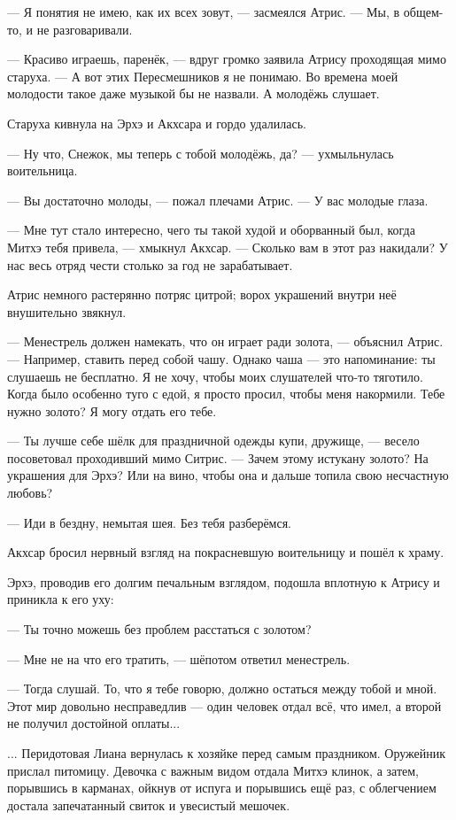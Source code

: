 --- Я понятия не имею, как их всех зовут, --- засмеялся Атрис.
--- Мы, в общем-то, и не разговаривали.

--- Красиво играешь, паренёк, --- вдруг громко заявила Атрису проходящая мимо старуха.
--- А вот этих Пересмешников я не понимаю.
Во времена моей молодости такое даже музыкой бы не назвали.
А молодёжь слушает.

Старуха кивнула на Эрхэ и Акхсара и гордо удалилась.

--- Ну что, Снежок, мы теперь с тобой молодёжь, да? --- ухмыльнулась воительница.

--- Вы достаточно молоды, --- пожал плечами Атрис.
--- У вас молодые глаза.

--- Мне тут стало интересно, чего ты такой худой и оборванный был, когда Митхэ тебя привела, --- хмыкнул Акхсар.
--- Сколько вам в этот раз накидали?
У нас весь отряд чести столько за год не зарабатывает.

Атрис немного растерянно потряс цитрой;
ворох украшений внутри неё внушительно звякнул.

--- Менестрель должен намекать, что он играет ради золота, --- объяснил Атрис.
--- Например, ставить перед собой чашу.
Однако чаша --- это напоминание: ты слушаешь не бесплатно.
Я не хочу, чтобы моих слушателей что-то тяготило.
Когда было особенно туго с едой, я просто просил, чтобы меня накормили.
Тебе нужно золото?
Я могу отдать его тебе.

--- Ты лучше себе шёлк для праздничной одежды купи, дружище, --- весело посоветовал проходивший мимо Ситрис.
--- Зачем этому истукану золото?
На украшения для Эрхэ?
Или на вино, чтобы она и дальше топила свою несчастную любовь?

--- Иди в бездну, немытая шея.
Без тебя разберёмся.

Акхсар бросил нервный взгляд на покрасневшую воительницу и пошёл к храму.

Эрхэ, проводив его долгим печальным взглядом, подошла вплотную к Атрису и приникла к его уху:

--- Ты точно можешь без проблем расстаться с золотом?

--- Мне не на что его тратить, --- шёпотом ответил менестрель.

--- Тогда слушай.
То, что я тебе говорю, должно остаться между тобой и мной.
Этот мир довольно несправедлив --- один человек отдал всё, что имел, а второй не получил достойной оплаты...

... Перидотовая Лиана вернулась к хозяйке перед самым праздником.
Оружейник прислал питомицу.
Девочка с важным видом отдала Митхэ клинок, а затем, порывшись в карманах, ойкнув от испуга и порывшись ещё раз, с облегчением достала запечатанный свиток и увесистый мешочек.


